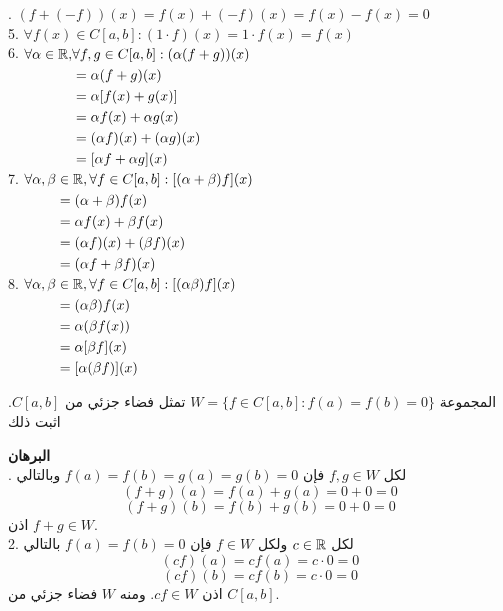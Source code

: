  . $(f+(-f))(x) = f(x) + (-f)(x) = f(x) - f(x) = 0$\\
 5. $\forall f(x) \in C[a, b] : (1\cdot f)(x) = 1\cdot f(x) = f(x)$\\
 6. $
 \begin{aligned}[t]
 	\forall\alpha\in\mathbb{R}, &\forall f,g\in C[a, b] : (\alpha(f+g))(x)\\
 	&= \alpha (f+g)(x)\\
 	&= \alpha[f(x) + g(x)]\\
 	&= \alpha f(x) + \alpha g(x)\\
 	&= (\alpha f)(x) + (\alpha g)(x)\\
 	&= [\alpha f + \alpha g](x)
 \end{aligned}
 $\\
 7. $
 \begin{aligned}[t]
 	\forall\alpha,\beta&\in\mathbb{R}, \forall f\in C[a, b] : [(\alpha + \beta)f](x)\\
 	&= (\alpha+\beta)f(x)\\
 	&= \alpha f(x) + \beta f(x)\\
 	&= (\alpha f)(x) + (\beta f)(x)\\
 	&= (\alpha f + \beta f)(x) 
 \end{aligned}
 $\\
 8. $
 \begin{aligned}[t]
 	\forall\alpha,\beta&\in\mathbb{R}, \forall f\in C[a, b] : [(\alpha  \beta)f](x)\\
 	&= (\alpha\beta)f(x)\\
 	&= \alpha (\beta f(x))\\
 	&= \alpha [\beta f](x)\\
 	&= [\alpha(\beta f)](x)
 \end{aligned}
 $
 
 
 \begin{example}
 	المجموعة $W = \{f\in C[a, b] : f(a) = f(b) =0\}$ تمثل فضاء جزئي من $C[a, b]$. اثبت ذلك 
 \end{example}
 \noindent
 \textbf{البرهان}\\
 . لكل $f, g\in W$ فإن $f(a)=f(b)=g(a)=g(b)=0$ وبالتالي
 \[
 (f+g)(a) = f(a) + g(a) = 0+0 =0
 \]
 \[
 (f+g)(b) = f(b) + g(b) = 0+0=0
 \]
 اذن $f+g\in W$.\\
 2. لكل $c\in \mathbb{R}$ ولكل $f\in W$ فإن $f(a)=f(b)=0$ بالتالي
 \[
 (cf)(a) = cf(a) = c\cdot 0 =0
 \]
 \[
  (cf)(b) = cf(b) = c\cdot 0 =0
 \]
 اذن $cf \in W$. ومنه $W$ فضاء جزئي من $C[a, b]$. 